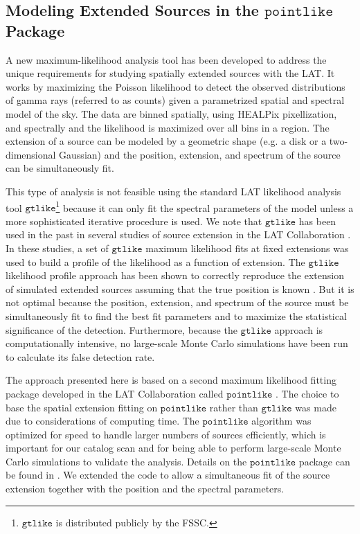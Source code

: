 \documentclass[12pt,preprint]{aastex}
\newcommand{\gtlike}{\ensuremath{\mathtt{gtlike}}\xspace}
\newcommand{\pointlike}{\ensuremath{\mathtt{pointlike}}\xspace}
\begin{document}
\subsection{Modeling Extended Sources in the \pointlike Package}

A new maximum-likelihood analysis tool has been developed to address the
unique requirements for studying spatially extended sources with the LAT.
It works by maximizing the Poisson 
likelihood to detect the observed distributions of gamma rays (referred to as counts)
given a parametrized spatial and spectral model of the sky.  
The data are binned spatially, using HEALPix pixellization, and spectrally 
\citep{healpix} and the likelihood is maximized over all bins in
a region.
The extension of a source can be modeled by a geometric shape
(e.g. a disk or a two-dimensional Gaussian) and the position, extension,
and spectrum of the source can be simultaneously fit.

This type of analysis is not feasible using the standard LAT likelihood
analysis tool \gtlike\footnote{\gtlike is distributed publicly by the
FSSC.} because it can only fit the spectral parameters of the model
unless a more sophisticated iterative procedure is used.  
We note that \gtlike has been used in the
past in several studies of source extension in the LAT Collaboration
\citep{lmc,smc,w28,w51c}.  In these studies, a 
set of \gtlike maximum likelihood fits at fixed extensions was used
to build a profile of the likelihood as a function of extension.
The \gtlike likelihood profile approach has been shown to correctly
reproduce the extension of simulated extended sources assuming that the
true position is known \citep{francesco_2011}.  But it is not optimal
because the position, extension, and spectrum of the source must be
simultaneously fit to find the best fit parameters and to maximize the
statistical significance of the detection.  Furthermore, because the \gtlike
approach is computationally intensive, no large-scale Monte Carlo
simulations have been run to calculate its false detection rate.

The approach presented here is based on a second maximum likelihood
fitting package developed in the LAT Collaboration called \pointlike
\citep{first_cat,matthew_kerr_thesis}.  The choice to base the
spatial extension fitting on \pointlike rather than \gtlike was made
due to considerations of computing time.  The \pointlike algorithm was
optimized for speed to handle larger numbers of sources efficiently,
which is important for our catalog scan and for being able
to perform large-scale Monte Carlo simulations to validate the analysis.
Details on the \pointlike package can be
found in \cite{matthew_kerr_thesis}.  We extended the code to allow a
simultaneous fit of the source extension together with the position and
the spectral parameters.
\end{document}
